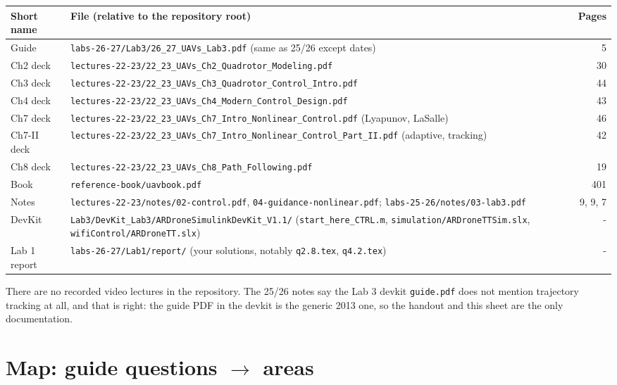 \documentclass[10pt,a4paper]{article}
\begin{document}
\begin{tabularx}{\textwidth}{@{}l X r@{}}
\toprule
Short name & File (relative to the repository root) & Pages\\
\midrule
Guide & \texttt{labs-26-27/Lab3/26\_27\_UAVs\_Lab3.pdf} (same as 25/26 except dates) & 5\\
Ch2 deck & \texttt{lectures-22-23/22\_23\_UAVs\_Ch2\_Quadrotor\_Modeling.pdf} & 30\\
Ch3 deck & \texttt{lectures-22-23/22\_23\_UAVs\_Ch3\_Quadrotor\_Control\_Intro.pdf} & 44\\
Ch4 deck & \texttt{lectures-22-23/22\_23\_UAVs\_Ch4\_Modern\_Control\_Design.pdf} & 43\\
Ch7 deck & \texttt{lectures-22-23/22\_23\_UAVs\_Ch7\_Intro\_Nonlinear\_Control.pdf} (Lyapunov, LaSalle) & 46\\
Ch7-II deck & \texttt{lectures-22-23/22\_23\_UAVs\_Ch7\_Intro\_Nonlinear\_Control\_Part\_II.pdf} (adaptive, tracking) & 42\\
Ch8 deck & \texttt{lectures-22-23/22\_23\_UAVs\_Ch8\_Path\_Following.pdf} & 19\\
Book & \texttt{reference-book/uavbook.pdf} & 401\\
Notes & \texttt{lectures-22-23/notes/02-control.pdf}, \texttt{04-guidance-nonlinear.pdf}; \texttt{labs-25-26/notes/03-lab3.pdf} & 9, 9, 7\\
DevKit & \texttt{Lab3/DevKit\_Lab3/ARDroneSimulinkDevKit\_V1.1/} (\texttt{start\_here\_CTRL.m}, \texttt{simulation/ARDroneTTSim.slx}, \texttt{wifiControl/ARDroneTT.slx}) & -\\
Lab 1 report & \texttt{labs-26-27/Lab1/report/} (your solutions, notably \texttt{q2.8.tex}, \texttt{q4.2.tex}) & -\\
\bottomrule
\end{tabularx}

\vspace{0.5ex}
There are no recorded video lectures in the repository.
The 25/26 notes say the Lab 3 devkit \texttt{guide.pdf} does not mention trajectory tracking at all, and that is right: the guide PDF in the devkit is the generic 2013 one, so the handout and this sheet are the only documentation.

\section*{Map: guide questions $\rightarrow$ areas}
\end{document}
